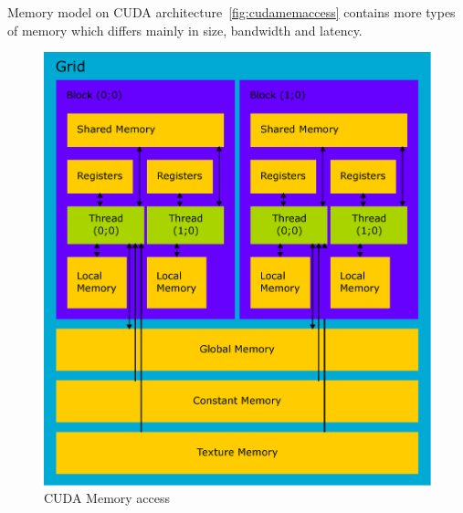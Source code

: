 Memory model on CUDA architecture~\autoref{fig:cudamemaccess} contains more types of memory which differs mainly in size, bandwidth and latency.

\begin{figure}[h]
  \centering
  \includegraphics[width=0.6\linewidth]{img/CUDAmemAccess.eps}
  \caption{CUDA Memory access}
  \label{fig:cudamemaccess}
\end{figure}

